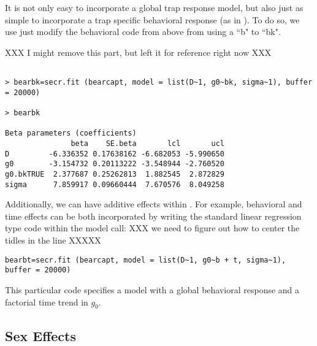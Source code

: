 It is not only easy to incorporate a global trap response model, but also just as simple to
incorporate a trap specific behavioral response (as in
\citet{royle_etal:2009}).  To do so, we use just modify
the behavioral code from above from using a ``b" to ``bk".

XXX I might remove this part, but left it for reference right now XXX
{\small
\begin{verbatim}

> bearbk=secr.fit (bearcapt, model = list(D~1, g0~bk, sigma~1), buffer = 20000)

> bearbk

Beta parameters (coefficients)
               beta    SE.beta       lcl       ucl
D         -6.336352 0.17638162 -6.682053 -5.990650
g0        -3.154732 0.20113222 -3.548944 -2.760520
g0.bkTRUE  2.377687 0.25262813  1.882545  2.872829
sigma      7.859917 0.09660444  7.670576  8.049258
\end{verbatim}
}

Additionally, we can have additive effects within \secr.  For example, behavioral and time effects can be both incorporated by writing the standard linear regression type code within the model call:
XXX we need to figure out how to center the tidles in the line XXXXX
\begin{verbatim}
bearbt=secr.fit (bearcapt, model = list(D~1, g0~b + t, sigma~1), buffer = 20000)
\end{verbatim}

This particular code specifies a model with a global behavioral response and a factorial time trend in $g_0$.


\subsection{Sex Effects}

